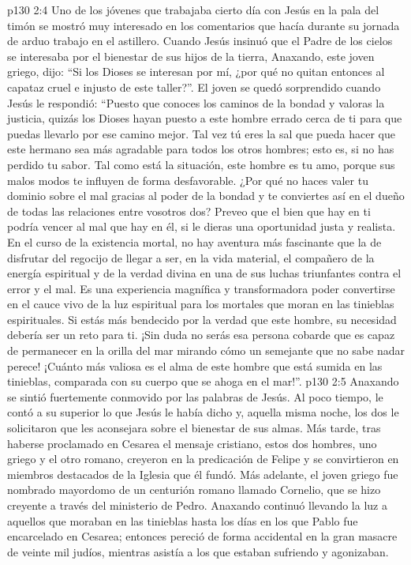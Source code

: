 \vs p130 2:4 \pc Uno de los jóvenes que trabajaba cierto día con Jesús en la pala del timón se mostró muy interesado en los comentarios que hacía durante su jornada de arduo trabajo en el astillero. Cuando Jesús insinuó que el Padre de los cielos se interesaba por el bienestar de sus hijos de la tierra, Anaxando, este joven griego, dijo: “Si los Dioses se interesan por mí, ¿por qué no quitan entonces al capataz cruel e injusto de este taller?”. El joven se quedó sorprendido cuando Jesús le respondió: “Puesto que conoces los caminos de la bondad y valoras la justicia, quizás los Dioses hayan puesto a este hombre errado cerca de ti para que puedas llevarlo por ese camino mejor. Tal vez tú eres la sal que pueda hacer que este hermano sea más agradable para todos los otros hombres; esto es, si no has perdido tu sabor. Tal como está la situación, este hombre es tu amo, porque sus malos modos te influyen de forma desfavorable. ¿Por qué no haces valer tu dominio sobre el mal gracias al poder de la bondad y te conviertes así en el dueño de todas las relaciones entre vosotros dos? Preveo que el bien que hay en ti podría vencer al mal que hay en él, si le dieras una oportunidad justa y realista. En el curso de la existencia mortal, no hay aventura más fascinante que la de disfrutar del regocijo de llegar a ser, en la vida material, el compañero de la energía espiritual y de la verdad divina en una de sus luchas triunfantes contra el error y el mal. Es una experiencia magnífica y transformadora poder convertirse en el cauce vivo de la luz espiritual para los mortales que moran en las tinieblas espirituales. Si estás más bendecido por la verdad que este hombre, su necesidad debería ser un reto para ti. ¡Sin duda no serás esa persona cobarde que es capaz de permanecer en la orilla del mar mirando cómo un semejante que no sabe nadar perece! ¡Cuánto más valiosa es el alma de este hombre que está sumida en las tinieblas, comparada con su cuerpo que se ahoga en el mar!”.
\vs p130 2:5 Anaxando se sintió fuertemente conmovido por las palabras de Jesús. Al poco tiempo, le contó a su superior lo que Jesús le había dicho y, aquella misma noche, los dos le solicitaron que les aconsejara sobre el bienestar de sus almas. Más tarde, tras haberse proclamado en Cesarea el mensaje cristiano, estos dos hombres, uno griego y el otro romano, creyeron en la predicación de Felipe y se convirtieron en miembros destacados de la Iglesia que él fundó. Más adelante, el joven griego fue nombrado mayordomo de un centurión romano llamado Cornelio, que se hizo creyente a través del ministerio de Pedro. Anaxando continuó llevando la luz a aquellos que moraban en las tinieblas hasta los días en los que Pablo fue encarcelado en Cesarea; entonces pereció de forma accidental en la gran masacre de veinte mil judíos, mientras asistía a los que estaban sufriendo y agonizaban.
